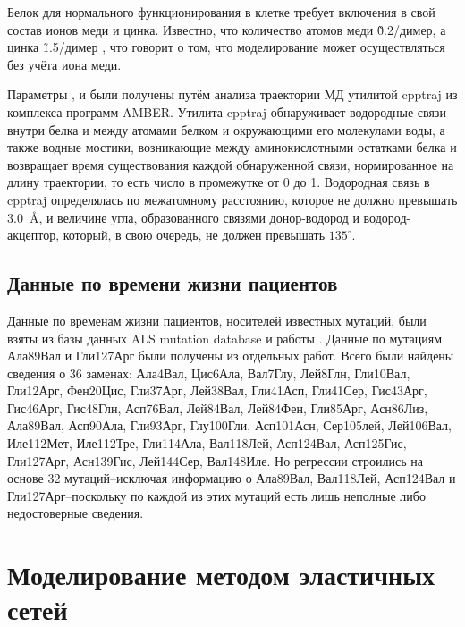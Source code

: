 Белок для нормального функционирования в клетке требует включения в свой состав ионов меди и цинка. Известно, что количество атомов меди \~0.2/димер, а цинка \~1.5/димер \cite{Ayers2014}, что говорит о том, что моделирование может осуществляться без учёта иона меди. 

Параметры \modelpphb{}, \modelpwhb{} и \modelwbr{} были получены путём анализа траектории МД утилитой cpptraj из комплекса программ AMBER. Утилита cpptraj обнаруживает водородные связи внутри белка и между атомами белком и окружающими его молекулами воды, а также водные мостики, возникающие между аминокислотными остатками белка и возвращает время существования каждой обнаруженной связи, нормированное на длину траектории, то есть число в промежутке от 0 до 1.  Водородная связь в cpptraj определялась по межатомному расстоянию, которое не должно превышать 3.0~\AA, и величине угла, образованного связями донор-водород и водород-акцептор, который, в свою очередь, не должен превышать $135^\circ$.

\subsection{Данные по времени жизни пациентов} \label{subsect_MD_survival_data}

Данные по временам жизни пациентов, носителей известных мутаций, были взяты из базы данных ALS mutation database \cite{Yoshida2010} и работы \cite{Wang2008}. Данные по мутациям Ала89Вал \cite{Sato2005} и Гли127Арг \cite{Holmoy2010} были получены из отдельных работ. Всего были найдены сведения о 36 заменах: Ала4Вал, Цис6Ала, Вал7Глу, Лей8Глн, Гли10Вал, Гли12Арг, Фен20Цис, Гли37Арг, Лей38Вал, Гли41Асп, Гли41Сер, Гис43Арг, Гис46Арг, Гис48Глн, Асп76Вал, Лей84Вал, Лей84Фен, Гли85Арг, Асн86Лиз, Ала89Вал, Асп90Ала, Гли93Арг, Глу100Гли, Асп101Асн, Сер105лей, Лей106Вал, Иле112Мет, Иле112Тре, Гли114Ала, Вал118Лей, Асп124Вал, Асп125Гис, Гли127Арг, Асн139Гис, Лей144Сер, Вал148Иле. Но регрессии строились на основе 32 мутаций--исключая информацию о Ала89Вал, Вал118Лей, Асп124Вал и Гли127Арг--поскольку по каждой из этих мутаций есть лишь неполные либо недостоверные сведения.

\section{Моделирование методом эластичных сетей} \label{sect_EN}

